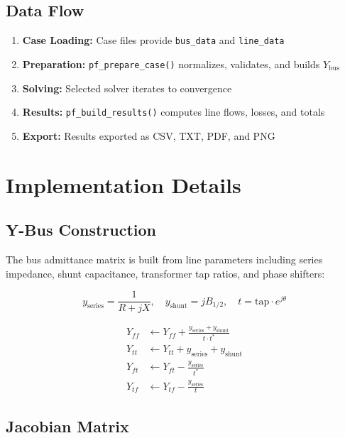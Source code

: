 \documentclass[12pt,a4paper]{article}
\begin{document}
\subsection{Data Flow}

\begin{enumerate}
    \item \textbf{Case Loading:} Case files provide \texttt{bus\_data} and \texttt{line\_data}
    \item \textbf{Preparation:} \texttt{pf\_prepare\_case()} normalizes, validates, and builds $Y_{\text{bus}}$
    \item \textbf{Solving:} Selected solver iterates to convergence
    \item \textbf{Results:} \texttt{pf\_build\_results()} computes line flows, losses, and totals
    \item \textbf{Export:} Results exported as CSV, TXT, PDF, and PNG
\end{enumerate}

\section{Implementation Details}

\subsection{Y-Bus Construction}

The bus admittance matrix is built from line parameters including series impedance, shunt capacitance, transformer tap ratios, and phase shifters:

\begin{equation}
y_{\text{series}} = \frac{1}{R + jX}, \quad y_{\text{shunt}} = jB_{1/2}, \quad t = \text{tap} \cdot e^{j\theta}
\end{equation}

\begin{align}
Y_{ff} &\leftarrow Y_{ff} + \frac{y_{\text{series}} + y_{\text{shunt}}}{t \cdot t^*} \\
Y_{tt} &\leftarrow Y_{tt} + y_{\text{series}} + y_{\text{shunt}} \\
Y_{ft} &\leftarrow Y_{ft} - \frac{y_{\text{series}}}{t^*} \\
Y_{tf} &\leftarrow Y_{tf} - \frac{y_{\text{series}}}{t}
\end{align}

\subsection{Jacobian Matrix}
\end{document}

